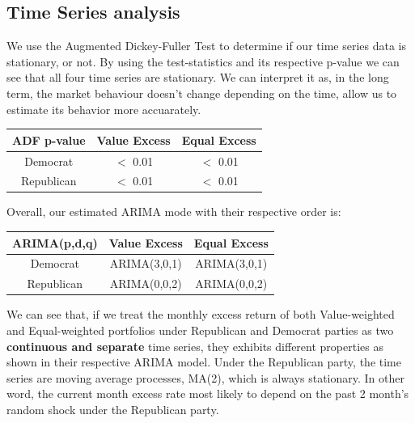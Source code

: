 \documentclass[a4paper]{article}
\begin{document}
\subsection{Time Series analysis}\label{Results}
\vspace{-10pt} 
\hspace{12pt} We use the Augmented Dickey-Fuller Test to determine if our time series data is stationary, or not. By using the test-statistics and its respective p-value we can see that all four time series are stationary. We can interpret it as, in the long term, the market behaviour doesn't change depending on the time, allow us to estimate its behavior more accuarately. 

\begin{center}
\begin{tabular}{||c | c c ||} 
 \hline
 ADF p-value & Value Excess & Equal Excess \\ [0.5ex] 
 \hline\hline
 Democrat &  $<$ 0.01 & $<$ 0.01  \\ 
 \hline
 Republican   & $<$ 0.01  & $<$ 0.01  \\
 \hline
 

\end{tabular}
\end{center}


Overall, our estimated ARIMA mode with their respective order is: 

\begin{center}
\begin{tabular}{||c | c c ||} 
 \hline
  ARIMA(p,d,q) & Value Excess & Equal Excess \\ [0.5ex] 
 \hline\hline
 Democrat &  ARIMA(3,0,1) & ARIMA(3,0,1)  \\ 
 \hline
 Republican   & ARIMA(0,0,2) & ARIMA(0,0,2) \\
 \hline
 
\end{tabular}
\end{center}

We can see that, if we treat the monthly excess return of both Value-weighted and Equal-weighted portfolios under Republican and Democrat parties as two \textbf{continuous and separate} time series, they exhibits different properties as shown in their respective ARIMA model. Under the Republican party, the time series are moving average processes, MA(2), which is always stationary. In other word, the current month excess rate most likely to depend on the past 2 month's random shock under the Republican party.
\end{document}
